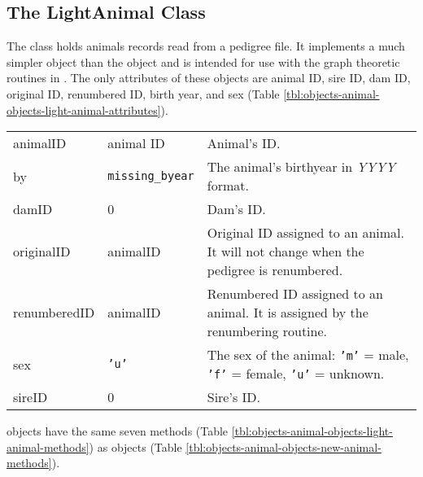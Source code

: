 \subsection{The LightAnimal Class}
\label{sec:objects-animal-objects-light-animal}
The  class holds animals records read from a pedigree file. It implements a much simpler object than the  object and is intended for use with the graph theoretic routines in . The only attributes of these objects are animal ID, sire ID, dam ID, original ID, renumbered ID, birth year, and sex (Table \ref{tbl:objects-animal-objects-light-animal-attributes}).
\begin{center}
    \tablelasttail{\hline}
    \label{tbl:objects-animal-objects-light-animal-attributes}
    \begin{xtabular}{l|l|p{4in}}
        animalID & animal ID & Animal's ID. \\
        by & \texttt{missing_byear} & The animal's birthyear in \emph{YYYY} format. \\
        damID & 0 & Dam's ID. \\
        originalID & animalID & Original ID assigned to an animal. It will not change when the pedigree is renumbered. \\
        renumberedID & animalID & Renumbered ID assigned to an animal. It is assigned by the renumbering routine. \\
        sex & \texttt{'u'} & The sex of the animal: \texttt{'m'} = male, \texttt{'f'} = female, \texttt{'u'} = unknown. \\
        sireID & 0 & Sire's ID. \\
    \end{xtabular}
\end{center}
 objects have the same seven methods (Table \ref{tbl:objects-animal-objects-light-animal-methods}) as  objects (Table \ref{tbl:objects-animal-objects-new-animal-methods}).
